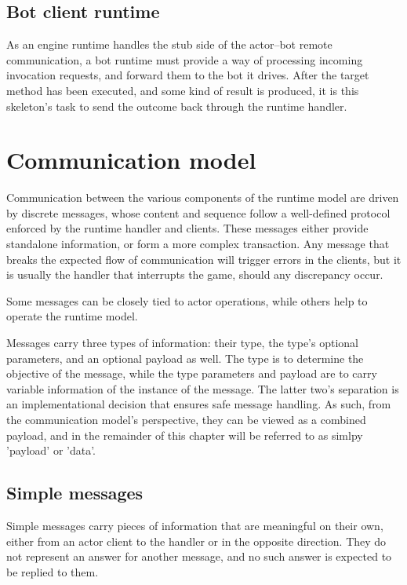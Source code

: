 		\subsection*{Bot client runtime}
		
		As an engine runtime handles the stub side of the actor--bot remote communication, a bot runtime must provide a way of processing incoming invocation requests, and forward them to the bot it drives. After the target method has been executed, and some kind of result is produced, it is this skeleton's task to send the outcome back through the runtime handler.

	\section{Communication model}

		Communication between the various components of the runtime model are driven by discrete messages, whose content and sequence follow a well-defined protocol enforced by the runtime handler and clients. These messages either provide standalone information, or form a more complex transaction. Any message that breaks the expected flow of communication will trigger errors in the clients, but it is usually the handler that interrupts the game, should any discrepancy occur.
		
		Some messages can be closely tied to actor operations, while others help to operate the runtime model. 

		Messages carry three types of information: their type, the type's optional parameters, and an optional payload as well. The type is to determine the objective of the message, while the type parameters and payload are to carry variable information of the instance of the message. The latter two's separation is an implementational decision that ensures safe message handling. As such, from the communication model's perspective, they can be viewed as a combined payload, and in the remainder of this chapter will be referred to as simlpy 'payload' or 'data'.  

		\subsection*{Simple messages}
		
		Simple messages carry pieces of information that are meaningful on their own, either from an actor client to the handler or in the opposite direction. They do not represent an answer for another message, and no such answer is expected to be replied to them.
		
